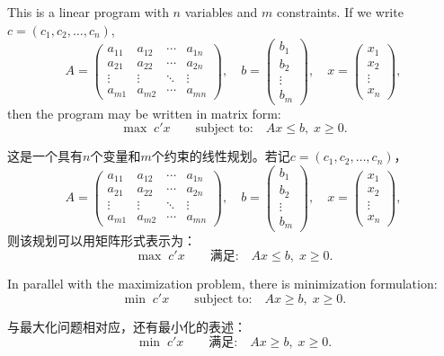 \begin{original}
This is a linear program with $n$ variables and $m$ constraints. If we write $c = (c_1, c_2, \ldots, c_n)$,
\[
A = \begin{pmatrix}
a_{11} & a_{12} & \cdots & a_{1n} \\
a_{21} & a_{22} & \cdots & a_{2n} \\
\vdots & \vdots & \ddots & \vdots \\
a_{m1} & a_{m2} & \cdots & a_{mn}
\end{pmatrix},\quad
b = \begin{pmatrix} b_1 \\ b_2 \\ \vdots \\ b_m \end{pmatrix},\quad
x = \begin{pmatrix} x_1 \\ x_2 \\ \vdots \\ x_n \end{pmatrix},
\]
then the program may be written in matrix form:
\[
\max \; c'x \qquad \text{subject to:} \quad Ax \le b,\; x \ge 0. \tag{4.1}
\]
\end{original}
\begin{translation}
这是一个具有$n$个变量和$m$个约束的线性规划。若记$c = (c_1, c_2, \ldots, c_n)$，
\[
A = \begin{pmatrix}
a_{11} & a_{12} & \cdots & a_{1n} \\
a_{21} & a_{22} & \cdots & a_{2n} \\
\vdots & \vdots & \ddots & \vdots \\
a_{m1} & a_{m2} & \cdots & a_{mn}
\end{pmatrix},\quad
b = \begin{pmatrix} b_1 \\ b_2 \\ \vdots \\ b_m \end{pmatrix},\quad
x = \begin{pmatrix} x_1 \\ x_2 \\ \vdots \\ x_n \end{pmatrix},
\]
则该规划可以用矩阵形式表示为：
\[
\max \; c'x \qquad \text{满足:} \quad Ax \le b,\; x \ge 0. \tag{4.1}
\]
\end{translation}

\begin{original}
In parallel with the maximization problem, there is minimization formulation:
\[
\min \; c'x \qquad \text{subject to:} \quad Ax \ge b,\; x \ge 0. \tag{4.2}
\]
\end{original}
\begin{translation}
与最大化问题相对应，还有最小化的表述：
\[
\min \; c'x \qquad \text{满足:} \quad Ax \ge b,\; x \ge 0. \tag{4.2}
\]
\end{translation}

